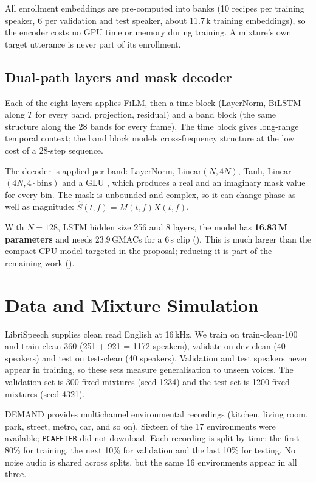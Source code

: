 \documentclass[11pt,a4paper]{article}
\begin{document}
All enrollment embeddings are pre-computed into banks (10 recipes per training speaker, 6 per
validation and test speaker, about 11.7\,k training embeddings), so the encoder costs no GPU time
or memory during training. A mixture's own target utterance is never part of its enrollment.

\subsection{Dual-path layers and mask decoder}
Each of the eight layers applies FiLM, then a time block (LayerNorm, BiLSTM along $T$ for every
band, projection, residual) and a band block (the same structure along the 28 bands for every
frame). The time block gives long-range temporal context; the band block models cross-frequency
structure at the low cost of a 28-step sequence.

The decoder is applied per band: LayerNorm, Linear$(N,4N)$, Tanh, Linear$(4N,4\cdot\text{bins})$
and a GLU \cite{dauphin2017glu}, which produces a real and an imaginary mask value for every bin.
The mask is unbounded and complex, so it can change phase as well as magnitude:
$\hat{S}(t,f)=M(t,f)X(t,f)$.

With $N=128$, LSTM hidden size 256 and 8 layers, the model has \textbf{16.83\,M parameters} and
needs 23.9\,GMACs for a 6\,s clip (). This is much larger than the compact CPU model
targeted in the proposal; reducing it is part of the remaining work ().

\section{Data and Mixture Simulation}
\label{sec:data}

LibriSpeech \cite{panayotov2015librispeech} supplies clean read English at 16\,kHz. We train on
train-clean-100 and train-clean-360 (251 + 921 = 1172 speakers), validate on dev-clean (40
speakers) and test on test-clean (40 speakers). Validation and test speakers never appear in
training, so these sets measure generalisation to unseen voices. The validation set is 300 fixed
mixtures (seed 1234) and the test set is 1200 fixed mixtures (seed 4321).

DEMAND \cite{thiemann2013demand} provides multichannel environmental recordings (kitchen, living
room, park, street, metro, car, and so on). Sixteen of the 17 environments were available;
\texttt{PCAFETER} did not download. Each recording is split by time: the first 80\% for training,
the next 10\% for validation and the last 10\% for testing. No noise audio is shared across splits,
but the same 16 environments appear in all three.
\end{document}
